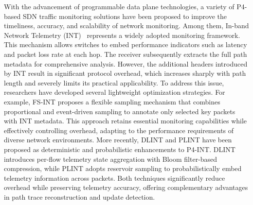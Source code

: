 \noindent With the advancement of programmable data plane technologies, a variety of P4-based SDN traffic monitoring solutions have been proposed to improve the timeliness, accuracy, and scalability of network monitoring. 
Among them, In-band Network Telemetry (INT)~\cite{INT} represents a widely adopted monitoring framework. 
This mechanism allows switches to embed performance indicators such as latency and packet loss rate at each hop. 
The receiver subsequently extracts the full path metadata for comprehensive analysis. 
However, the additional headers introduced by INT result in significant protocol overhead, which increases sharply with path length and severely limits its practical applicability. 
To address this issue, researchers have developed several lightweight optimization strategies. 
For example, FS-INT \cite{SUH202062} proposes a flexible sampling mechanism that combines proportional and event-driven sampling to annotate only selected key packets with INT metadata. 
This approach retains essential monitoring capabilities while effectively controlling overhead, adapting to the performance requirements of diverse network environments. 
More recently, DLINT and PLINT \cite{10206040} have been proposed as deterministic and probabilistic enhancements to P4-INT. 
DLINT introduces per-flow telemetry state aggregation with Bloom filter-based compression, while PLINT adopts reservoir sampling to probabilistically embed telemetry information across packets. 
Both techniques significantly reduce overhead while preserving telemetry accuracy, offering complementary advantages in path trace reconstruction and update detection.

